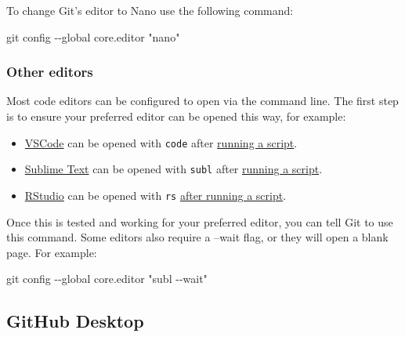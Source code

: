 \documentclass[
  letterpaper,
  DIV=11,
  numbers=noendperiod]{scrartcl}
\newenvironment{Shaded}{\begin{snugshade}}{\end{snugshade}}
\newcommand{\NormalTok}[1]{\textcolor[rgb]{0.00,0.23,0.31}{#1}}
\newcommand{\SpecialCharTok}[1]{\textcolor[rgb]{0.37,0.37,0.37}{#1}}
\newcommand{\StringTok}[1]{\textcolor[rgb]{0.13,0.47,0.30}{#1}}
\begin{document}
To change Git's editor to Nano use the following command:

\begin{Shaded}
\begin{Highlighting}[]
\NormalTok{git config }\SpecialCharTok{{-}{-}}\NormalTok{global core.editor }\StringTok{"nano"}
\end{Highlighting}
\end{Shaded}

\subsubsection{Other editors}\label{other-editors}

Most code editors can be configured to open via the command line. The
first step is to ensure your preferred editor can be opened this way,
for example:

\begin{itemize}
\item
  \href{https://code.visualstudio.com}{VSCode} can be opened with
  \texttt{code} after
  \href{https://stackoverflow.com/questions/29955500/code-not-working-in-command-line-for-visual-studio-code-on-osx-mac}{running
  a script}.
\item
  \href{https://www.sublimetext.com}{Sublime Text} can be opened with
  \texttt{subl} after
  \href{https://stackoverflow.com/questions/25152711/subl-command-not-working-command-not-found/25154529}{running
  a script}.
\item
  \href{https://rstudio.com/products/rstudio}{RStudio} can be opened
  with \texttt{rs}
  \href{https://www.xiegerts.com/post/open-rstudio-from-terminal/}{after
  running a script}.
\end{itemize}

Once this is tested and working for your preferred editor, you can tell
Git to use this command. Some editors also require a --wait flag, or
they will open a blank page. For example:

\begin{Shaded}
\begin{Highlighting}[]
\NormalTok{git config }\SpecialCharTok{{-}{-}}\NormalTok{global core.editor }\StringTok{"subl {-}{-}wait"}
\end{Highlighting}
\end{Shaded}

\subsection{GitHub Desktop}
\end{document}
